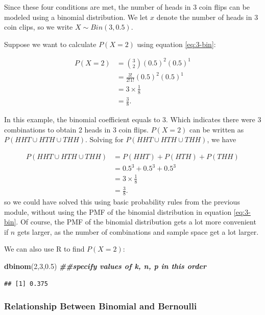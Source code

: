 \documentclass[
]{book}
\newenvironment{Shaded}{\begin{snugshade}}{\end{snugshade}}
\newcommand{\DecValTok}[1]{\textcolor[rgb]{0.00,0.00,0.81}{#1}}
\newcommand{\DocumentationTok}[1]{\textcolor[rgb]{0.56,0.35,0.01}{\textbf{\textit{#1}}}}
\newcommand{\FloatTok}[1]{\textcolor[rgb]{0.00,0.00,0.81}{#1}}
\newcommand{\FunctionTok}[1]{\textcolor[rgb]{0.13,0.29,0.53}{\textbf{#1}}}
\newcommand{\NormalTok}[1]{#1}
\begin{document}
Since these four conditions are met, the number of heads in 3 coin flips can be modeled using a binomial distribution. We let \(x\) denote the number of heads in 3 coin clips, so we write \(X \sim Bin(3,0.5)\).

Suppose we want to calculate \(P(X=2)\) using equation \eqref{eq:3-bin}:

\[
\begin{split}
P(X=2) &= \binom{3}{2} (0.5)^2 (0.5)^1\\
       &= \frac{3!}{2! 1!} (0.5)^2 (0.5)^1 \\
       &= 3 \times \frac{1}{8} \\
       &= \frac{3}{8}.
\end{split}
\]

In this example, the binomial coefficient equals to 3. Which indicates there were 3 combinations to obtain 2 heads in 3 coin flips. \(P(X=2)\) can be written as \(P(HHT \cup HTH \cup THH)\). Solving for \(P(HHT \cup HTH \cup THH)\), we have

\[
\begin{split}
P(HHT \cup HTH \cup THH) &= P(HHT) + P(HTH) + P(THH)\\
       &= 0.5^3 + 0.5^3 + 0.5^3 \\
       &= 3 \times \frac{1}{8} \\
       &= \frac{3}{8}.
\end{split}
\]
so we could have solved this using basic probability rules from the previous module, without using the PMF of the binomial distribution in equation \eqref{eq:3-bin}. Of course, the PMF of the binomial distribution gets a lot more convenient if \(n\) gets larger, as the number of combinations and sample space get a lot larger.

We can also use R to find \(P(X=2)\):

\begin{Shaded}
\begin{Highlighting}[]
\FunctionTok{dbinom}\NormalTok{(}\DecValTok{2}\NormalTok{,}\DecValTok{3}\NormalTok{,}\FloatTok{0.5}\NormalTok{) }\DocumentationTok{\#\#specify values of k, n, p in this order}
\end{Highlighting}
\end{Shaded}

\begin{verbatim}
## [1] 0.375
\end{verbatim}

\subsubsection{Relationship Between Binomial and Bernoulli}\label{relationship-between-binomial-and-bernoulli}
\end{document}
